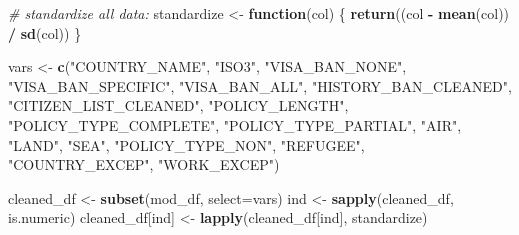 \documentclass[]{article}
\newenvironment{Shaded}{\begin{snugshade}}{\end{snugshade}}
\newcommand{\CommentTok}[1]{\textcolor[rgb]{0.56,0.35,0.01}{\textit{#1}}}
\newcommand{\ControlFlowTok}[1]{\textcolor[rgb]{0.13,0.29,0.53}{\textbf{#1}}}
\newcommand{\DataTypeTok}[1]{\textcolor[rgb]{0.13,0.29,0.53}{#1}}
\newcommand{\DecValTok}[1]{\textcolor[rgb]{0.00,0.00,0.81}{#1}}
\newcommand{\KeywordTok}[1]{\textcolor[rgb]{0.13,0.29,0.53}{\textbf{#1}}}
\newcommand{\NormalTok}[1]{#1}
\newcommand{\OperatorTok}[1]{\textcolor[rgb]{0.81,0.36,0.00}{\textbf{#1}}}
\newcommand{\StringTok}[1]{\textcolor[rgb]{0.31,0.60,0.02}{#1}}
\begin{document}
\begin{Shaded}
\begin{Highlighting}[]
\CommentTok{# standardize all data:}
\NormalTok{standardize <-}\StringTok{ }\ControlFlowTok{function}\NormalTok{(col) \{}
  \KeywordTok{return}\NormalTok{((col }\OperatorTok{-}\StringTok{ }\KeywordTok{mean}\NormalTok{(col)) }\OperatorTok{/}\StringTok{ }\KeywordTok{sd}\NormalTok{(col))}
\NormalTok{\}}

\NormalTok{vars <-}\StringTok{ }\KeywordTok{c}\NormalTok{(}\StringTok{"COUNTRY_NAME"}\NormalTok{, }\StringTok{"ISO3"}\NormalTok{, }\StringTok{"VISA_BAN_NONE"}\NormalTok{, }\StringTok{"VISA_BAN_SPECIFIC"}\NormalTok{, }\StringTok{"VISA_BAN_ALL"}\NormalTok{,}
          \StringTok{"HISTORY_BAN_CLEANED"}\NormalTok{, }\StringTok{"CITIZEN_LIST_CLEANED"}\NormalTok{, }\StringTok{"POLICY_LENGTH"}\NormalTok{,}
          \StringTok{"POLICY_TYPE_COMPLETE"}\NormalTok{, }\StringTok{"POLICY_TYPE_PARTIAL"}\NormalTok{, }\StringTok{"AIR"}\NormalTok{, }\StringTok{"LAND"}\NormalTok{, }\StringTok{"SEA"}\NormalTok{, }
          \StringTok{"POLICY_TYPE_NON"}\NormalTok{, }\StringTok{"REFUGEE"}\NormalTok{, }\StringTok{"COUNTRY_EXCEP"}\NormalTok{, }\StringTok{"WORK_EXCEP"}\NormalTok{)}

\NormalTok{cleaned_df <-}\StringTok{ }\KeywordTok{subset}\NormalTok{(mod_df, }\DataTypeTok{select=}\NormalTok{vars)}
\NormalTok{ind <-}\StringTok{ }\KeywordTok{sapply}\NormalTok{(cleaned_df, is.numeric)}
\NormalTok{cleaned_df[ind] <-}\StringTok{ }\KeywordTok{lapply}\NormalTok{(cleaned_df[ind], standardize)}
\end{Highlighting}
\end{Shaded}

\begin{Shaded}
\end{Shaded}
\end{document}
